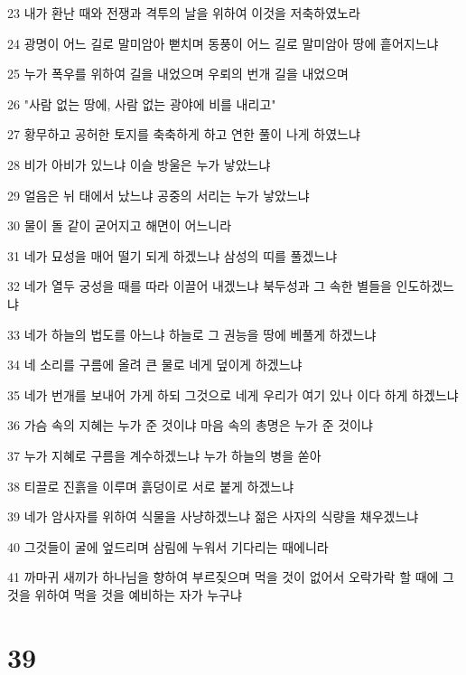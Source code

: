 \par 23 내가 환난 때와 전쟁과 격투의 날을 위하여 이것을 저축하였노라
\par 24 광명이 어느 길로 말미암아 뻗치며 동풍이 어느 길로 말미암아 땅에 흩어지느냐
\par 25 누가 폭우를 위하여 길을 내었으며 우뢰의 번개 길을 내었으며
\par 26 "사람 없는 땅에, 사람 없는 광야에 비를 내리고"
\par 27 황무하고 공허한 토지를 축축하게 하고 연한 풀이 나게 하였느냐
\par 28 비가 아비가 있느냐 이슬 방울은 누가 낳았느냐
\par 29 얼음은 뉘 태에서 났느냐 공중의 서리는 누가 낳았느냐
\par 30 물이 돌 같이 굳어지고 해면이 어느니라
\par 31 네가 묘성을 매어 떨기 되게 하겠느냐 삼성의 띠를 풀겠느냐
\par 32 네가 열두 궁성을 때를 따라 이끌어 내겠느냐 북두성과 그 속한 별들을 인도하겠느냐
\par 33 네가 하늘의 법도를 아느냐 하늘로 그 권능을 땅에 베풀게 하겠느냐
\par 34 네 소리를 구름에 올려 큰 물로 네게 덮이게 하겠느냐
\par 35 네가 번개를 보내어 가게 하되 그것으로 네게 우리가 여기 있나 이다 하게 하겠느냐
\par 36 가슴 속의 지혜는 누가 준 것이냐 마음 속의 총명은 누가 준 것이냐
\par 37 누가 지혜로 구름을 계수하겠느냐 누가 하늘의 병을 쏟아
\par 38 티끌로 진흙을 이루며 흙덩이로 서로 붙게 하겠느냐
\par 39 네가 암사자를 위하여 식물을 사냥하겠느냐 젊은 사자의 식량을 채우겠느냐
\par 40 그것들이 굴에 엎드리며 삼림에 누워서 기다리는 때에니라
\par 41 까마귀 새끼가 하나님을 향하여 부르짖으며 먹을 것이 없어서 오락가락 할 때에 그것을 위하여 먹을 것을 예비하는 자가 누구냐

\chapter{39}

